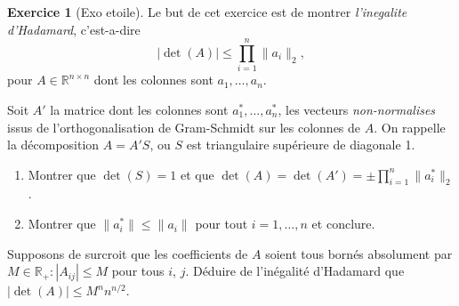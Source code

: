 \documentclass[a4paper,12pt,french]{report}
\theoremstyle{plain}
\theoremstyle{definition}
\newtheorem{exercise}{Exercice}[chapter]
\begin{document}
\begin{exercise}[Exo etoile]
Le but de cet exercice est de montrer \emph{l'inegalite d'Hadamard}, c'est-a-dire
$$
|\det(A)|\le \prod_{i=1}^{n} \lVert a_{i} \rVert_{2},
$$
pour $A\in \mathbb{R}^{n\times n}$ dont les colonnes sont $a_{1},\dots,a_{n}$.

Soit $A'$ la matrice dont les colonnes sont $a_{1}^{*},\dots,a_{n}^{*}$, les vecteurs \emph{non-normalises} issus de l'orthogonalisation de Gram-Schmidt sur les colonnes de $A$. On rappelle la décomposition $A=A'S$, ou $S$ est triangulaire supérieure de diagonale 1.
\begin{enumerate}
\item Montrer que $\det(S)=1$ et que $\det(A)=\det(A')=\pm \prod_{i=1}^{n}\lVert a_{i}^{*} \rVert_{2}$.
\item Montrer que $\lVert a_{i}^{*} \rVert\le \lVert a_{i} \rVert$ pour tout $i=1,\dots,n$ et conclure.
\end{enumerate}

Supposons de surcroit que les coefficients de $A$ soient tous bornés absolument par $M\in \mathbb{R}_{+}:|A_{ij}|\le M$ pour tous $i$, $j$. Déduire de l'inégalité d'Hadamard que $|\det(A)|\le M^{n}n^{n/2}$.
\end{exercise}
\end{document}
